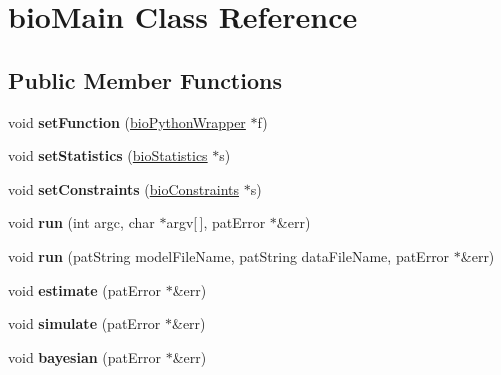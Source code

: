\hypertarget{classbio_main}{}\section{bio\+Main Class Reference}
\label{classbio_main}
\subsection*{Public Member Functions}
\begin{DoxyCompactItemize}
\item 
\mbox{\label{classbio_main_a050760cabbe60f5a8beeb5309cf16ca6}} 
void {\bfseries set\+Function} (\hyperlink{classbio_python_wrapper}{bio\+Python\+Wrapper} $\ast$f)
\item 
\mbox{\label{classbio_main_a46fe29b14f9df6028d7fe8106c633a30}} 
void {\bfseries set\+Statistics} (\hyperlink{classbio_statistics}{bio\+Statistics} $\ast$s)
\item 
\mbox{\label{classbio_main_aefe58f9ab505f2eec964e77eee3cb1aa}} 
void {\bfseries set\+Constraints} (\hyperlink{classbio_constraints}{bio\+Constraints} $\ast$s)
\item 
\mbox{\label{classbio_main_a943200792e2173b0c36ed623dbdcef8c}} 
void {\bfseries run} (int argc, char $\ast$argv\mbox{[}$\,$\mbox{]}, pat\+Error $\ast$\&err)
\item 
\mbox{\label{classbio_main_a92edbdddb18cc5ac0140d73e59b6c93e}} 
void {\bfseries run} (pat\+String model\+File\+Name, pat\+String data\+File\+Name, pat\+Error $\ast$\&err)
\item 
\mbox{\label{classbio_main_a0308d4860b24a76024a4b5d81bc2ff33}} 
void {\bfseries estimate} (pat\+Error $\ast$\&err)
\item 
\mbox{\label{classbio_main_a06e491d3d474fec87643e32050e8deda}} 
void {\bfseries simulate} (pat\+Error $\ast$\&err)
\item 
\mbox{\label{classbio_main_a294037830922e805f62f2b7e78b0ae84}} 
void {\bfseries bayesian} (pat\+Error $\ast$\&err)
\item 

\end{DoxyCompactItemize}
